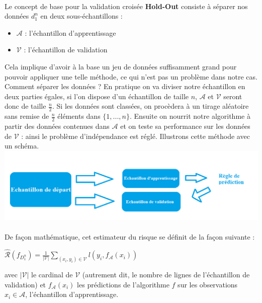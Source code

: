 \documentclass[14pt, openany]{article}
\begin{document}
\paragraph{}
Le concept de base pour la validation croisée \textbf{Hold-Out} consiste à séparer nos données $d^{n}_{1}$ en deux sous-échantillons :
\begin{itemize}
\item $\mathcal{A}$ : l'échantillon d'apprentissage
\item $\mathcal{V}$ : l'échantillon de validation
\end{itemize}
\bigskip
Cela implique d'avoir à la base un jeu de données suffisamment \og grand \fg{} pour pouvoir appliquer une telle méthode, ce qui n'est pas un problème dans notre cas. Comment séparer les données ? En pratique on va diviser notre échantillon en deux parties égales, si l'on dispose d'un échantillon de taille $n$, $\mathcal{A}$ et $\mathcal{V}$ seront donc de taille $\frac{n}{2}$. Si les données sont classées, on procèdera à un tirage aléatoire sans remise de $\frac{n}{2}$ éléments dans $\{1,...,n\}$.
Ensuite on \og nourrit \fg{} notre algorithme à partir des données contenues dans $\mathcal{A}$ et on teste sa performance sur les données de $\mathcal{V}$ : ainsi le problème d'indépendance est réglé. Illustrons cette méthode avec un schéma.\\
\includegraphics[width=18cm]{Images/hold_out.png}
\begin{center}
\label{fig1}
\end{center}
\paragraph{}
De façon mathématique, cet estimateur du risque se définit de la façon suivante :
\begin{center}
$\widehat{\mathcal{R}}(f_{D^{n}_{1}}) = \frac{1}{|\mathcal{V}|} \sum\limits_{(x_i,y_i) \in \mathcal{V}} l(y_i,f_{\mathcal{A}}(x_i))$
\end{center}
 avec $|\mathcal{V}|$ le cardinal de $\mathcal{V}$ (autrement dit, le nombre de lignes de l'échantillon de validation) et $f_{\mathcal{A}}(x_i)$ les prédictions de l'algorithme $f$ sur les observations $x_i \in \mathcal{A}$, l'échantillon d'apprentissage.
\end{document}
